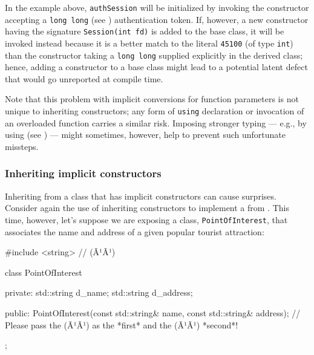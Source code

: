 \noindent In the example above, \lstinline!authSession! will be initialized by
invoking the constructor accepting a \lstinline!long!~\lstinline!long! (see ) 
authentication token. If, however, a new
constructor having the signature \lstinline!Session(int!~\lstinline!fd)! is added to the
base class, it will be invoked instead because it is a better match to the
literal \lstinline!45100! (of type \lstinline!int!) than the constructor
taking a \lstinline!long!~\lstinline!long! supplied explicitly in the derived
class; hence, adding a constructor to a base class might lead to a
potential latent defect that would go unreported at compile
time.

Note that this problem with implicit conversions for function parameters is not unique
to inheriting constructors; any form of \lstinline!using! declaration or
invocation of an overloaded function carries a similar risk. Imposing
stronger typing --- e.g., by using  (see ) 
--- might sometimes, however, help to prevent such
unfortunate missteps.

\subsubsection[Inheriting \emph{implicit} constructors]{Inheriting {\sfbsubsubsecitalRomeo implicit} constructors}\label{beware-of-inheriting-implicit-constructors}

Inheriting from a class that has implicit constructors can cause
surprises. Consider again the use of inheriting constructors to
implement a  from . 
This time, however, let's suppose we are
exposing a class,
\lstinline!PointOfInterest!, that associates the name and address of a
given popular tourist attraction:

\begin{emcppslisting}[language=C++]
#include <string>  // (Ã¹{}Ã¹)

class PointOfInterest
{
private:
    std::string d_name;
    std::string d_address;

public:
    PointOfInterest(const std::string& name, const std::string& address);
        // Please pass the (Ã¹{}Ã¹) as the *first* and the (Ã¹{}Ã¹) *second*!
};
\end{emcppslisting}
    
